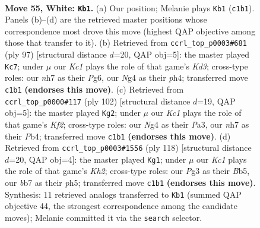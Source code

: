 \documentclass[11pt]{article}
\begin{document}
\clearpage

\begin{figure}[p]\centering
\begin{subfigure}{0.46\textwidth}\centering
\resizebox{\linewidth}{!}{%
\newchessgame
\chessboard[
  setfen={8/kb5n/8/8/p2p2N1/P5P1/1PP5/2K5 w - - 28 55},
  showmover=false,
  pgfstyle=straightmove, color=movearrow, markmove={c1-b1}
]}
\caption{}
\end{subfigure}\hfill
\begin{subfigure}{0.46\textwidth}\centering
\resizebox{\linewidth}{!}{%
\newchessgame
\chessboard[
  setfen={8/8/3k2p1/2p1pp2/P6P/3P2P1/4K3/8 b - - 0 49},
  showmover=false,
  pgfstyle=straightmove, color=movearrow, markmove={d6-c7}
]}
\caption{}
\end{subfigure}
\\[4pt]
\begin{subfigure}{0.46\textwidth}\centering
\resizebox{\linewidth}{!}{%
\newchessgame
\chessboard[
  setfen={8/p7/3k4/1p3p1p/1P5P/P3P1P1/5K2/8 w - - 20 52},
  showmover=false,
  pgfstyle=straightmove, color=movearrow, markmove={f2-g2}
]}
\caption{}
\end{subfigure}\hfill
\begin{subfigure}{0.46\textwidth}\centering
\resizebox{\linewidth}{!}{%
\newchessgame
\chessboard[
  setfen={8/4b3/4P2k/1B2p2p/4Pp2/5P2/6PK/8 w - - 1 60},
  showmover=false,
  pgfstyle=straightmove, color=movearrow, markmove={h2-g1}
]}
\caption{}
\end{subfigure}
\caption{\textbf{Move 55, White: \texttt{Kb1}.} (a) Our position; Melanie plays \texttt{Kb1} (\texttt{c1b1}). Panels (b)--(d) are the retrieved master positions whose correspondence most drove this move (highest QAP objective among those that transfer to it). (b) Retrieved from \texttt{ccrl\_top\_p0003\#681} (ply 97) [structural distance $d$=20, QAP obj=5]: the master played \texttt{Kc7}; under $\mu$ our \emph{Kc1} plays the role of that game's \emph{Kd3}; cross-type roles: our \emph{n}h7 as their \emph{P}g6, our \emph{N}g4 as their \emph{p}h4; transferred move \texttt{c1b1} \textbf{(endorses this move)}. (c) Retrieved from \texttt{ccrl\_top\_p0000\#117} (ply 102) [structural distance $d$=19, QAP obj=5]: the master played \texttt{Kg2}; under $\mu$ our \emph{Kc1} plays the role of that game's \emph{Kf2}; cross-type roles: our \emph{N}g4 as their \emph{P}a3, our \emph{n}h7 as their \emph{P}b4; transferred move \texttt{c1b1} \textbf{(endorses this move)}. (d) Retrieved from \texttt{ccrl\_top\_p0003\#1556} (ply 118) [structural distance $d$=20, QAP obj=4]: the master played \texttt{Kg1}; under $\mu$ our \emph{Kc1} plays the role of that game's \emph{Kh2}; cross-type roles: our \emph{P}g3 as their \emph{B}b5, our \emph{b}b7 as their \emph{p}h5; transferred move \texttt{c1b1} \textbf{(endorses this move)}. Synthesis: 11 retrieved analogs transferred to \texttt{Kb1} (summed QAP objective 44, the strongest correspondence among the candidate moves); Melanie committed it via the \texttt{search} selector.}
\label{fig:thought-m108}
\end{figure}
\end{document}
